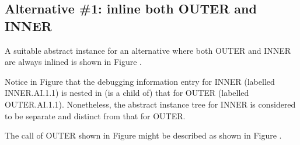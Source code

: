 \subsection{Alternative \#1: inline both OUTER and INNER}
\label{app:inlinebothouterandinner}

A suitable abstract instance for an alternative where both
OUTER and INNER are always inlined is shown in 
Figure .

Notice in 
Figure  
that the debugging information entry for
INNER (labelled INNER.AI.1.1) is nested in (is a child of)
that for OUTER (labelled OUTER.AI.1.1). Nonetheless, the
abstract instance tree for INNER is considered to be separate
and distinct from that for OUTER.

The call of OUTER shown in 
Figure 
might be described as
shown in 
Figure .


